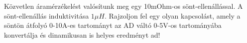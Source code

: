 \begin{example}

Közvetlen áramérzékelést valósítunk meg egy 10mOhm-os sönt-ellenállással. A sönt-ellenállás induktivitása $1\mu{}H$. Rajzoljon fel egy olyan kapcsolást, amely a söntön átfolyó 0-10A-es tartományt az AD váltó 0-5V-os tartományába konvertálja és dinamikusan is helyes eredményt ad!

\tcbline
\vspace{1mm}

\solution

\end{example}